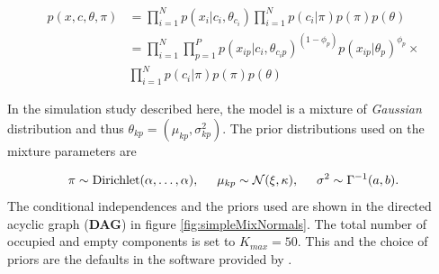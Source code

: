 \documentclass{bioinfo}
\begin{document}
\begin{methods}
\begin{align*}
p(x, c, \theta, \pi) &= \prod_{i=1}^N p(x_i | c_i, \theta_{c_i}) \prod_{i=1}^N p (c_i | \pi) p(\pi) p(\theta)  \\
&= \prod_{i=1}^N \prod_{p=1}^P p(x_{ip} | c_i, \theta_{c_ip})^{(1 - \phi_p)} p(x_{ip} | \theta_p) ^ {\phi_p} \times \\
& \prod_{i=1}^N p (c_i | \pi) p(\pi) p(\theta)
\end{align*}


In the simulation study described here, the model is a mixture of \emph{Gaussian} distribution and thus \(\theta_{kp}=(\mu_{kp}, \sigma^2_{kp})\). The prior distributions used on the mixture parameters are

\begin{align}
	\pi \sim \textrm{Dirichlet}(\alpha, \ldots, \alpha), \hspace{0.5cm} \mu_{kp} \sim \mathcal{N}(\xi, \kappa), \hspace{0.5cm} \sigma^2 \sim \Gamma^{-1}(a, b). \nonumber
\end{align}
The conditional independences and the priors used are shown in the directed acyclic graph (\textbf{DAG}) in figure \ref{fig:simpleMixNormals}. The total number of occupied and empty components is set to $K_{max}=50$. This and the choice of priors are the defaults in the software provided by \cite{mason2016mdi}.


\end{methods}
\end{document}
